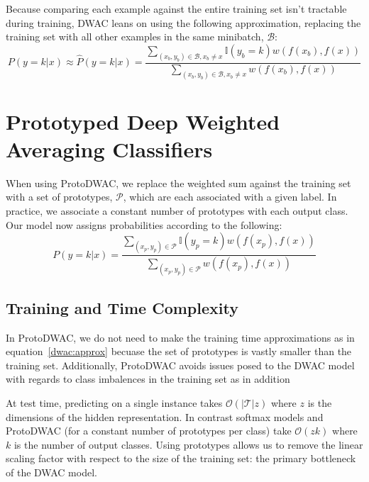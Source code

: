 \documentclass[11pt,letterpaper]{article}
\newcommand{\mc}{\mathcal}
\newcommand{\I}{\mathbb{I}}
\begin{document}
Because comparing each example against the entire training set isn't tractable during training, DWAC leans on using the following approximation, replacing the training set with all other
examples in the same minibatch, $\mc{B}$:
\begin{equation} \label{dwac:approx}
  P(y = k | x) \approx \widehat{P}(y = k | x) = \frac{\sum_{(x_b, y_b) \in \mc{B}, x_b \neq x} \I(y_b = k) w(f(x_b), f(x))}{\sum_{(x_b, y_b) \in \mc{B}, x_b \neq x} w(f(x_b), f(x))}
\end{equation}

\section{Prototyped Deep Weighted Averaging Classifiers}
When using ProtoDWAC, we replace the weighted sum against the training set with a set of prototypes, $\mc{P}$, which are each associated with a given label. In practice, we associate a
constant number of prototypes with each output class. Our model now assigns probabilities according to the following:
\begin{equation} \label{proto:probs}
  P(y = k | x) = \frac{\sum_{(x_p, y_p) \in \mc{P}} \I(y_p = k) w(f(x_p), f(x))}{\sum_{(x_p, y_p) \in \mc{P}} w(f(x_p), f(x))}
\end{equation}

\subsection{Training and Time Complexity}
In ProtoDWAC, we do not need to make the training time approximations as in equation~\ref{dwac:approx} becuase the set of prototypes is vastly smaller than the training set. Additionally, ProtoDWAC avoids issues posed to the DWAC model with regards to class imbalences in the training set as in addition

At test time, predicting on a single instance takes $\mc{O}(|\mc{T}|z)$ where $z$ is the dimensions of the hidden representation. In contrast softmax models and ProtoDWAC (for a constant number of prototypes per class) take $\mc{O}(zk)$ where $k$ is the number of output classes. Using prototypes allows us to remove the linear scaling factor with respect to the size of the training set: the primary bottleneck of the DWAC model.
\end{document}
